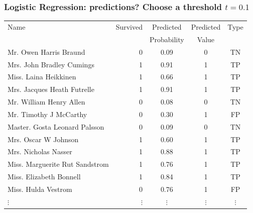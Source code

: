 \documentclass[aspectratio=169]{beamer}
\theoremstyle{principle}
\begin{document}
\begin{frame}
\frametitle{Logistic Regression: predictions?  Choose a threshold $t = 0.1$}

\begin{table}[ht]
\centering
\begin{tabular}{l | r | c | c | c}

 Name & Survived & Predicted & Predicted & Type\\ 
&&Probability&Value\\
  \hline
  \hline
 Mr. Owen Harris Braund &   0 & 0.09 & 0 & TN\\ 
 Mrs. John Bradley Cumings &   1 & 0.91 & 1 & TP\\ 
 Miss. Laina Heikkinen &   1 & 0.66 & 1 & TP\\ 
 Mrs. Jacques Heath Futrelle &   1 & 0.91 & 1 & TP\\ 
 Mr. William Henry Allen &   0 & 0.08 & 0 & TN\\ 
 Mr. Timothy J McCarthy &   0 & 0.30 & 1 & FP\\ 
 Master. Gosta Leonard Palsson &   0 & 0.09 & 0 & TN\\ 
 Mrs. Oscar W Johnson &   1 & 0.60 & 1 & TP\\ 
 Mrs. Nicholas Nasser &   1 & 0.88 & 1 & TP\\ 
 Miss. Marguerite Rut Sandstrom &   1 & 0.76 & 1 & TP\\ 
 Miss. Elizabeth Bonnell &   1 & 0.84 &1 & TP\\ 
 Miss. Hulda Vestrom &   0 & 0.76 &1 & FP\\ 
$\vdots$ & $\vdots$ & $\vdots$ & $\vdots$ & $\vdots$
\end{tabular}
\end{table}

\end{frame}
\end{document}
